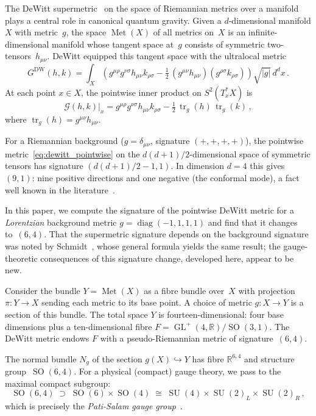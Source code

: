 \documentclass[12pt,a4paper]{article}
\theoremstyle{definition}
\newcommand{\tr}{\operatorname{tr}}
\newcommand{\Met}{\operatorname{Met}}
\newcommand{\GL}{\operatorname{GL}}
\newcommand{\SO}{\operatorname{SO}}
\newcommand{\SU}{\operatorname{SU}}
\newcommand{\diag}{\operatorname{diag}}
\newcommand{\R}{\mathbb{R}}
\begin{document}
The DeWitt supermetric~\cite{DeWitt1967} on the space of Riemannian metrics over a manifold plays a central role in canonical quantum gravity.
Given a $d$-dimensional manifold $X$ with metric~$g$, the space $\Met(X)$ of all metrics on~$X$ is an infinite-dimensional manifold whose tangent space at~$g$ consists of symmetric two-tensors~$h_{\mu\nu}$.
DeWitt equipped this tangent space with the ultralocal metric
\begin{equation}
\label{eq:dewitt}
G^{\mathrm{DW}}(h,k) = \int_X \left( g^{\mu\rho}g^{\nu\sigma} h_{\mu\nu} k_{\rho\sigma} - \tfrac{1}{2}\, (g^{\mu\nu}h_{\mu\nu})(g^{\rho\sigma}k_{\rho\sigma}) \right) \sqrt{|g|}\, d^dx\,.
\end{equation}
At each point $x \in X$, the pointwise inner product on $S^2(T_x^*X)$ is
\begin{equation}
\label{eq:dewitt_pointwise}
\mathcal{G}(h,k)\big|_x = g^{\mu\rho}g^{\nu\sigma} h_{\mu\nu} k_{\rho\sigma} - \tfrac{1}{2}\, \tr_g(h)\, \tr_g(k)\,,
\end{equation}
where $\tr_g(h) = g^{\mu\nu}h_{\mu\nu}$.

For a Riemannian background ($g = \delta_{\mu\nu}$, signature $(+,+,+,+)$), the pointwise metric~\eqref{eq:dewitt_pointwise} on the $d(d{+}1)/2$-dimensional space of symmetric tensors has signature $(d(d{+}1)/2 - 1, 1)$.
In dimension $d = 4$ this gives $(9,1)$: nine positive directions and one negative (the conformal mode), a fact well known in the literature~\cite{Giulini2009,Fischer1970,Isham1976}.

\medskip

In this paper, we compute the signature of the pointwise DeWitt metric for a \emph{Lorentzian} background metric $g = \diag(-1,1,1,1)$ and find that it changes to~$(6,4)$.
That the supermetric signature depends on the background signature was noted by Schmidt~\cite{Schmidt1989}, whose general formula yields the same result; the gauge-theoretic consequences of this signature change, developed here, appear to be new.

Consider the bundle $Y = \Met(X)$ as a fibre bundle over~$X$ with projection $\pi\colon Y \to X$ sending each metric to its base point.
A choice of metric $g\colon X \to Y$ is a section of this bundle.
The total space $Y$ is fourteen-dimensional: four base dimensions plus a ten-dimensional fibre $F = \GL^+(4,\R)/\SO(3,1)$.
The DeWitt metric endows $F$ with a pseudo-Riemannian metric of signature~$(6,4)$.

The normal bundle $N_g$ of the section $g(X) \hookrightarrow Y$ has fibre $\R^{6,4}$ and structure group~$\SO(6,4)$.
For a physical (compact) gauge theory, we pass to the maximal compact subgroup:
\begin{equation}
\label{eq:PS_chain}
\SO(6,4) \;\supset\; \SO(6) \times \SO(4) \;\cong\; \SU(4) \times \SU(2)_L \times \SU(2)_R\,,
\end{equation}
which is precisely the \emph{Pati-Salam gauge group}~\cite{PatiSalam1974}.
\end{document}
